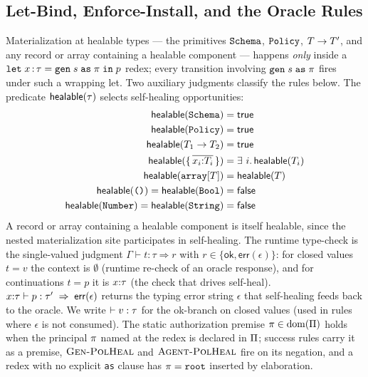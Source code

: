 \subsection{Let-Bind, Enforce-Install, and the Oracle Rules}
\label{app:rules-oracle}

Materialization at healable types --- the primitives $\texttt{Schema}$,
$\texttt{Policy}$, $T \to T'$, and any record or array containing a
healable component --- happens \emph{only} inside a
$\texttt{let}\; x\,{:}\,\tau = \texttt{gen}\;s\;\texttt{as}\;\pi\;\texttt{in}\;p$ redex; every transition involving
$\texttt{gen}\;s\;\texttt{as}\;\pi$ fires under such a wrapping let. Two auxiliary
judgments classify the rules below. The predicate $\mathsf{healable}(\tau)$
selects self-healing opportunities:
\begin{align*}
\mathsf{healable}(\texttt{Schema}) &= \mathsf{true} \\
\mathsf{healable}(\texttt{Policy}) &= \mathsf{true} \\
\mathsf{healable}(T_1 \to T_2) &= \mathsf{true} \\
\mathsf{healable}(\{\,\overline{x_i{:}T_i}\,\}) &= \exists~i.\,\mathsf{healable}(T_i) \\
\mathsf{healable}(\texttt{array}[T]) &= \mathsf{healable}(T) \\
\mathsf{healable}(\texttt{()}) = \mathsf{healable}(\texttt{Bool}) &= \mathsf{false} \\
\mathsf{healable}(\texttt{Number}) = \mathsf{healable}(\texttt{String}) &= \mathsf{false}
\end{align*}
A record or array containing a healable component is itself healable, since the nested materialization site participates in self-healing. The runtime type-check is the single-valued judgment $\Gamma \vdash t : \tau \Rightarrow r$ with $r \in \{\mathsf{ok}, \mathsf{err}(\epsilon)\}$: for closed values $t = v$ the context is $\emptyset$ (runtime re-check of an oracle response), and for continuations $t = p$ it is $x {:} \tau$ (the check that drives self-heal). $x {:} \tau \vdash p : \tau' \;\Rightarrow\; \mathsf{err}(\epsilon)$ returns the typing error string $\epsilon$ that self-healing feeds back to the oracle. We write $\vdash v : \tau$ for the ok-branch on closed values (used in rules where $\epsilon$ is not consumed). The static authorization premise $\pi \in \mathrm{dom}(\Pi)$ holds when the principal $\pi$ named at the redex is declared in $\Pi$; success rules carry it as a premise, $\textsc{Gen-PolHeal}$ and $\textsc{Agent-PolHeal}$ fire on its negation, and a redex with no explicit \texttt{as} clause has $\pi = \texttt{root}$ inserted by elaboration.

